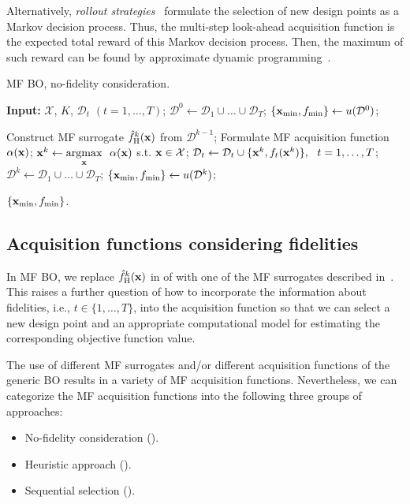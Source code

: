 \documentclass[iicol,sn-basic]{sn-jnl}%
\begin{document}
Alternatively, \textit{rollout strategies}~\citep{Lam2016,Lee2020} formulate the selection of new design points as a Markov
decision process.
Thus, the multi-step look-ahead acquisition function is the expected total reward of this Markov
decision process.
Then, the maximum of such reward can be found by approximate dynamic programming~\citep{Powell2011}.

\begin{algorithm}
	\caption{MF BO, no-fidelity consideration.}\label{Algo3}
	\begin{algorithmic}[1]
		\State \textbf{Input:} $\mathcal{X}$, $K$, $\mathcal{D}_t$ $(t=1,\dots,T)$;
		\State $\mathcal{D}^0 \gets \mathcal{D}_1 \cup \dots \cup \mathcal{D}_T$;
		\State $\{{\bf x}_{\min},f_{\min}\} \gets u(\mathcal{D}^0)$; \label{Algo3:3}
		
		\State Construct MF surrogate $\hat{f}_\text{H}^k({\bf x})$ from $\mathcal{D}^{k-1}$;
		\State Formulate MF acquisition function $\alpha({\bf x})$; \label{Algo3:6}
		\State ${\bf x}^{k} \gets \underset{{\bf x}}{\mathrm{argmax}} \ \ \alpha({\bf x})$ s.t. ${\bf x} \in \mathcal{X}$;
		\State $\mathcal{D}_t \gets \mathcal{D}_t \cup \{{\bf x}^{k},f_t({\bf x}^{k})\}, \ \ t=1,\dots,T$;
		\State $\mathcal{D}^k \gets \mathcal{D}_1 \cup \dots \cup \mathcal{D}_T$;
		\State $\{{\bf x}_{\min},f_{\min}\} \gets u(\mathcal{D}^k)$; \label{Algo3:10}
		\EndFor
		
		\State \Return $\{{\bf x}_{\min},f_{\min}\}$.
	\end{algorithmic}
\end{algorithm}

\subsection{Acquisition functions considering fidelities}\label{Sec52}

In MF BO, we replace $\hat{f}_\text{H}^k({\bf x})$ in  of  with one of the MF surrogates described in~.
This raises a further question of how to incorporate the information about fidelities, i.e., $t \in \{1,\dots,T\}$, into the acquisition function so that we can select a new design point and an appropriate computational model for estimating the corresponding objective function value. 
 
The use of different MF surrogates and/or different acquisition functions of the generic BO results in a variety of MF acquisition functions. Nevertheless, we can categorize the MF acquisition functions into the following three groups of approaches: 
\begin{itemize}
	\item No-fidelity consideration ().
	
	\item Heuristic approach ().
	
	\item Sequential selection ().
	 
\end{itemize}
\end{document}
